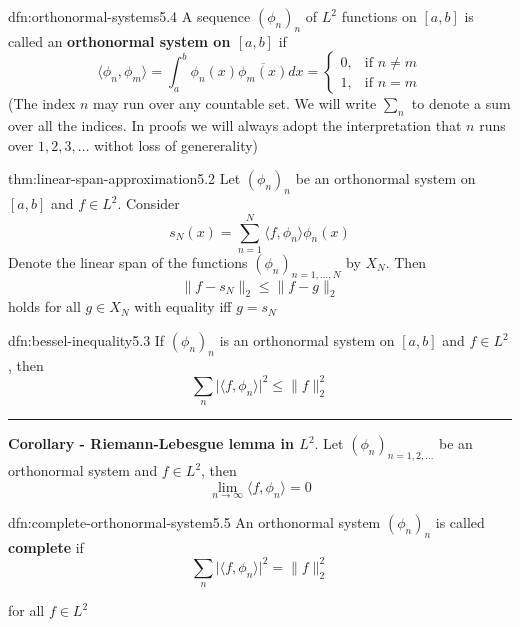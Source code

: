 \documentclass[landscape, 8pt]{extarticle}
\begin{document}
\begin{multicols}{3}
\begin{dfn}{dfn:orthonormal-systems}{5.4}
	A sequence $(\phi_{n})_{n}$ of $L^{2}$ functions on $[a, b]$ is called an \textbf{orthonormal system on $[a, b]$} if
	\[\langle \phi_{n}, \phi_{m} \rangle = \int_{a}^{b} \phi_{n}(x)\overline{\phi_{m}(x)} dx = \begin{cases}
		0, & \text{if $n \ne m$} \\
		1, & \text{if $n = m$}
	\end{cases}\]
	(The index $n$ may run over any countable set. We will write $\sum_{n}$ to denote a sum over all the indices. In proofs we will always adopt the interpretation that $n$ runs over $1,2,3,\dots$ withot loss of genererality)
\end{dfn}

\newpage
\begin{thm}[]{thm:linear-span-approximation}{5.2}
	Let $(\phi_{n})_{n}$ be an orthonormal system on $[a, b]$ and $f\in L^{2}$. Consider
	\[s_{N}(x) = \sum_{n = 1}^{N}\langle f, \phi_{n} \rangle \phi_{n}(x)\]
	Denote the linear span of the functions $(\phi_{n})_{n=1,\dots,N}$ by $X_{N}$. Then
	\[\lVert f - s_{N} \rVert_{2} \le \lVert f - g \rVert_{2}\]
	holds for all $g\in X_{N}$ with equality iff $g = s_{N}$
\end{thm}

\vspace{-5pt}
\begin{dfn}{dfn:bessel-inequality}{5.3}
	\vspace{-5pt}
	If $(\phi_{n})_{n}$ is an orthonormal system on $[a,b]$ and $f\in L^{2}$, then
	\[\sum_{n} \lvert \langle f, \phi_{n} \rangle \rvert^{2} \le \lVert f \rVert^{2}_{2}\]

	\noindent\rule{\textwidth}{0.2pt}
	\textbf{Corollary - Riemann-Lebesgue lemma in $L^{2}$}. Let $(\phi_{n})_{n=1,2,\dots}$ be an orthonormal system and $f\in L^{2}$, then
	\[\lim_{n\to \infty}\langle f, \phi_{n} \rangle = 0\]
\end{dfn}

\vspace{-5pt}
\begin{dfn}{dfn:complete-orthonormal-system}{5.5}
	\vspace{-5pt}
	An orthonormal system $(\phi_{n})_{n}$ is called \textbf{complete} if
	\[\sum_{n} \lvert \langle f, \phi_{n} \rangle \rvert^{2} = \lVert f \rVert^{2}_{2}\]

	\vspace{-2pt}
	for all $f\in L^{2}$
	

\end{dfn}
\end{multicols}
\end{document}
